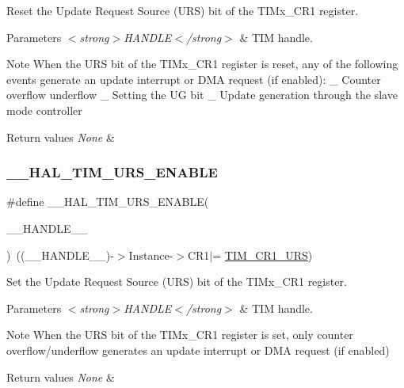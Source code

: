 Reset the Update Request Source (U\+RS) bit of the T\+I\+Mx\+\_\+\+C\+R1 register. 


\begin{DoxyParams}{Parameters}
{\em $<$strong$>$\+H\+A\+N\+D\+L\+E$<$/strong$>$} & T\+IM handle. \\
\hline
\end{DoxyParams}
\begin{DoxyNote}{Note}
When the U\+RS bit of the T\+I\+Mx\+\_\+\+C\+R1 register is reset, any of the following events generate an update interrupt or D\+MA request (if enabled)\+: \+\_\+ Counter overflow underflow \+\_\+ Setting the UG bit \+\_\+ Update generation through the slave mode controller 
\end{DoxyNote}

\begin{DoxyRetVals}{Return values}
{\em None} & \\
\hline
\end{DoxyRetVals}
\mbox{\label{group___t_i_m___exported___macros_ga3b06856bd6d7e10cfff342b1726db51d}} 
\subsubsection{\texorpdfstring{\_\_HAL\_TIM\_URS\_ENABLE}{\_\_HAL\_TIM\_URS\_ENABLE}}
{\footnotesize\ttfamily \#define \+\_\+\+\_\+\+H\+A\+L\+\_\+\+T\+I\+M\+\_\+\+U\+R\+S\+\_\+\+E\+N\+A\+B\+LE(\begin{DoxyParamCaption}\item[{}]{\+\_\+\+\_\+\+H\+A\+N\+D\+L\+E\+\_\+\+\_\+ }\end{DoxyParamCaption})~((\+\_\+\+\_\+\+H\+A\+N\+D\+L\+E\+\_\+\+\_\+)-\/$>$Instance-\/$>$C\+R1$\vert$= \mbox{\hyperlink{group___peripheral___registers___bits___definition_ga06c997c2c23e8bef7ca07579762c113b}{T\+I\+M\+\_\+\+C\+R1\+\_\+\+U\+RS}})}



Set the Update Request Source (U\+RS) bit of the T\+I\+Mx\+\_\+\+C\+R1 register. 


\begin{DoxyParams}{Parameters}
{\em $<$strong$>$\+H\+A\+N\+D\+L\+E$<$/strong$>$} & T\+IM handle. \\
\hline
\end{DoxyParams}
\begin{DoxyNote}{Note}
When the U\+RS bit of the T\+I\+Mx\+\_\+\+C\+R1 register is set, only counter overflow/underflow generates an update interrupt or D\+MA request (if enabled) 
\end{DoxyNote}

\begin{DoxyRetVals}{Return values}
{\em None} & \\
\hline
\end{DoxyRetVals}
